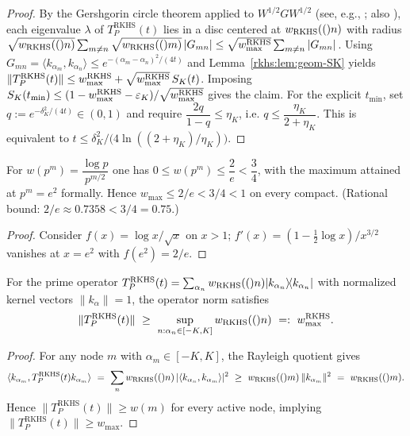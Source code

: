 \begin{proof}
By the Gershgorin circle theorem applied to $W^{1/2}GW^{1/2}$ (see, e.g., \cite[Thm.~6.1.1]{HornJohnson2013}; also \cite{Varga2004}), each eigenvalue $\lambda$ of $T_P^{\mathrm{RKHS}}(t)$ lies in a disc centered at $w_{\mathrm{RKHS}}(()n)$ with radius $\sqrt{w_{\mathrm{RKHS}}(()n)}\sum_{m\ne n} \sqrt{w_{\mathrm{RKHS}}(()m)}\,|G_{mn}|\le \sqrt{w_{\max}^{\mathrm{RKHS}}}\sum_{m\ne n}|G_{mn}|$. Using $G_{mn}=\langle k_{\alpha_m},k_{\alpha_n}\rangle\le e^{-(\alpha_m-\alpha_n)^2/(4t)}$ and Lemma~\ref{rkhs:lem:geom-SK} yields $\|T_P^{\mathrm{RKHS}}(t)\|\le w_{\max}^{\mathrm{RKHS}}+\sqrt{w_{\max}^{\mathrm{RKHS}}}\,S_K(t)$. Imposing $S_K(t_{\min})\le (1-w_{\max}^{\mathrm{RKHS}}-\varepsilon_K)/\sqrt{w_{\max}^{\mathrm{RKHS}}}$ gives the claim. For the explicit $t_{\min}$, set $q:=e^{-\delta_K^2/(4t)}\in(0,1)$ and require $\dfrac{2q}{1-q}\le\eta_K$, i.e. $q\le\dfrac{\eta_K}{2+\eta_K}$. This is equivalent to $t\le \delta_K^2/\bigl(4\ln((2+\eta_K)/\eta_K)\bigr)$.
\end{proof}

\begin{lemma}\label{rkhs:lem:wmax_cap}
For $w(p^m)=\dfrac{\log p}{p^{m/2}}$ one has $0\le w(p^m)\le \dfrac{2}{e} < \dfrac{3}{4}$, with the maximum attained at $p^m=e^2$ formally. Hence $w_{\max}\le 2/e < 3/4 <1$ on every compact. (Rational bound: $2/e\approx 0.7358 < 3/4 = 0.75$.)
\end{lemma}

\begin{proof}
Consider $f(x)=\log x/\sqrt{x}$ on $x>1$; $f'(x)=(1-\tfrac12\log x)/x^{3/2}$ vanishes at $x=e^2$ with $f(e^2)=2/e$.
\end{proof}

\begin{lemma}\label{rkhs:lem:rayleigh_lower}
For the prime operator $T_P^{\mathrm{RKHS}}(t)=\sum_{\alpha_n}w_{\mathrm{RKHS}}(()n)|k_{\alpha_n}\rangle\!\langle k_{\alpha_n}|$ with normalized kernel vectors $\|k_{\alpha}\|=1$, the operator norm satisfies
\begin{equation}\label{eq:RKHS_contraction-rayleigh-lower}
\|T_P^{\mathrm{RKHS}}(t)\|\ \ge\ \sup_{n:\alpha_n\in[-K,K]} \wRKHS(n)\ =:\ \wmax.
\end{equation}
\end{lemma}

\begin{proof}
For any node $m$ with $\alpha_m\in[-K,K]$, the Rayleigh quotient gives
\begin{equation}
\langle k_{\alpha_m}, T_P^{\mathrm{RKHS}}(t) k_{\alpha_m}\rangle\ =\ \sum_n \wRKHS(n)\,|\langle k_{\alpha_n},k_{\alpha_m}\rangle|^2\ \ge\ \wRKHS(m)\,\|k_{\alpha_m}\|^2\ =\ \wRKHS(m).
\end{equation}
Hence $\|T_P^{\mathrm{RKHS}}(t)\|\ge w(m)$ for every active node, implying $\|T_P^{\mathrm{RKHS}}(t)\|\ge w_{\max}$.
\end{proof}

